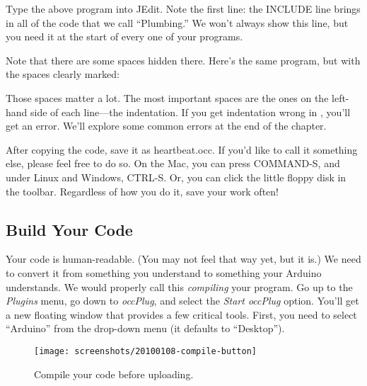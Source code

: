 

Type the above program into JEdit. Note the first line: the {\code INCLUDE} line brings in all of the code that we call ``Plumbing.'' We won't always show this line, but {\strong you need it at the start of every one of your programs}.

Note that there are some spaces hidden there. Here's the same program, but with the spaces clearly marked:



Those {\strong spaces matter a lot}. The most important spaces are the ones on the left-hand side of each line---the {\strong indentation}. If you get indentation wrong in \occam, you'll get an error. We'll explore some common errors at the end of the chapter. 

After copying the code, save it as {\code heartbeat.occ}. If you'd like to call it something else, please feel free to do so. On the Mac, you can press COMMAND-S, and under Linux and Windows, CTRL-S. Or, you can click the little floppy disk in the toolbar. Regardless of how you do it, save your work often!


\subsection{Build Your Code}
Your code is human-readable. (You may not feel that way yet, but it is.) We need to convert it from something you understand to something your Arduino understands. We would properly call this {\em compiling} your program. Go up to the {\em Plugins} menu, go down to {\em occPlug}, and select the {\em Start occPlug} option. You'll get a new floating window that provides a few critical tools. First, you need to select ``Arduino'' from the drop-down menu (it defaults to ``Desktop'').

\begin{figure}[ht]
  \begin{center}
    \texttt{[image: screenshots/20100108-compile-button]}
    \caption{Compile your code before uploading.}
    \label{screenshot:compile-button}
  \end{center}
\end{figure}

